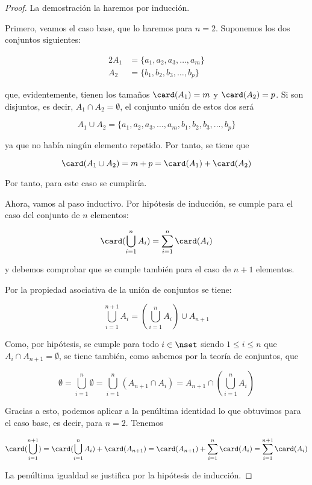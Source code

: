 \begin{proof}
  La demostración la haremos por inducción.

  Primero, veamos el caso base, que lo haremos para $n = 2$. Suponemos los
  dos conjuntos siguientes:

  \begin{alignat*}{2}
    A_1 &= \{a_1, a_2, a_3, \ldots, a_m\} \\
    A_2 &= \{b_1, b_2, b_3, \ldots, b_p\}
  \end{alignat*}

  \noindent que, evidentemente, tienen los tamaños $\card(A_1) = m$ y
  $\card(A_2) = p$. Si son disjuntos, es decir, $A_1 \cap A_2 = \emptyset$,
  el conjunto unión de estos dos será

  $$ A_1 \cup A_2 = \{a_1, a_2, a_3, \ldots, a_m, b_1, b_2, b_3, \ldots,
  b_p\}$$

  \noindent ya que no había ningún elemento repetido. Por tanto, se tiene
  que

  $$ \card(A_1 \cup A_2) = m + p = \card(A_1) + \card(A_2) $$

  \noindent Por tanto, para este caso se cumpliría.

  Ahora, vamos al paso inductivo. Por hipótesis de inducción, se cumple para
  el caso del conjunto de $n$ elementos:

  $$ \card(\bigcup_{i=1}^n A_i) = \sum_{i=1}^n \card(A_i) $$

  \noindent y debemos comprobar que se cumple también para el caso de $n+1$
  elementos.

  Por la propiedad asociativa de la unión de conjuntos se tiene:

  $$ \bigcup_{i=1}^{n+1} A_i = \left(\bigcup_{i=1}^{n} A_i \right) \cup
  A_{n+1} $$

  Como, por hipótesis, se cumple para todo $i \in \nset$ siendo $1 \leq i
  \leq n$ que $A_i \cap A_{n+1} = \emptyset$, se tiene también, como sabemos
  por la teoría de conjuntos, que

  $$ \emptyset = \bigcup_{i=1}^n \emptyset = \bigcup_{i=1}^n \left(A_{n+1}
  \cap A_i\right) = A_{n+1} \cap\left( \bigcup_{i=1}^n A_i \right) $$

  \noindent Gracias a esto, podemos aplicar a la penúltima identidad lo que
  obtuvimos para el caso base, es decir, para $n = 2$. Tenemos

  $$ \card(\bigcup_{i=1}^{n+1}) = \card(\bigcup_{i=1}^n A_i) +
  \card(A_{n+1}) = \card(A_{n+1}) + \sum_{i=1}^n \card(A_i) =
  \sum_{i=1}^{n+1} \card(A_i) $$

  \noindent La penúltima igualdad se justifica por la hipótesis de
  inducción.
\end{proof}

